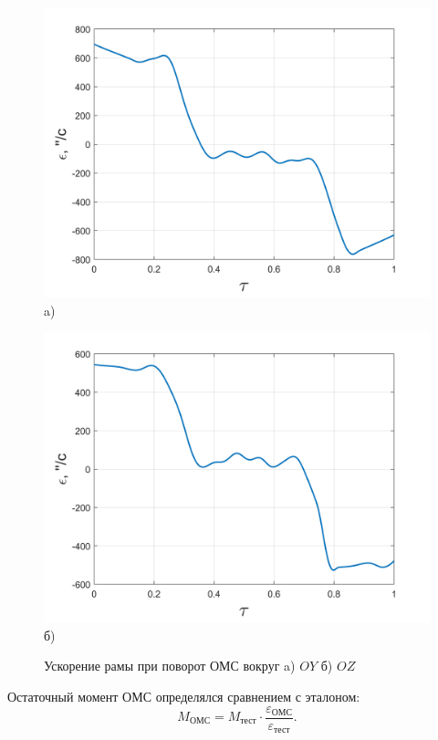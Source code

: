 \begin{figure}[!h]
	\begin{minipage}[b]{0.49\linewidth}\centering
		\includegraphics[width=0.9\linewidth]{matlab/img/oy-gyro-acc.png}\\[-2pt] a)
	\end{minipage}
	\hfill
	\begin{minipage}[b]{0.49\linewidth}\centering
		\includegraphics[width=0.9\linewidth]{matlab/img/oz-gyro-acc.png}\\[-2pt] б)
	\end{minipage}
	\caption{Ускорение рамы при поворот ОМС вокруг a) $OY$ б) $OZ$}
	\label{fig:oz-gyro}
\end{figure}

Остаточный момент ОМС определялся сравнением с эталоном:
\[
M_{\text{ОМС}} = M_{\text{тест}}\cdot\frac{\varepsilon_{\text{ОМС}}}{\varepsilon_{\text{тест}}}\!.
\]

